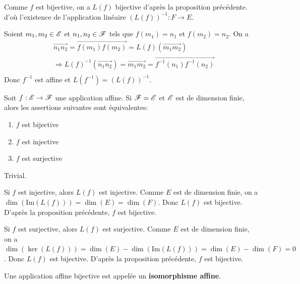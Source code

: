 \documentclass[a4paper, 12pt]{article}
\begin{document}
\begin{demonstration}
    Comme $f$ est bijective, on a $L(f)$ bijective d'après la proposition précédente.
    d'où l'existence de l'application linéaire $(L(f))^{-1}: F \to E$.

    Soient $m_1, m_2 \in \mathscr{E}$ et $n_1, n_2 \in \mathscr{F}$ tels que $f(m_1) = n_1$ et $f(m_2) = n_2$.
    On a
    \begin{align*}
        &\overrightarrow{n_1 n_2} = \overrightarrow{f(m_1) f(m_2)} = L(f)(\overrightarrow{m_1 m_2}) \\
        &\Rightarrow L(f)^{-1}(\overrightarrow{n_1 n_2}) = \overrightarrow{m_1 m_2} = \overrightarrow{f^{-1}(n_1)f^{-1}(n_2)} \\
    \end{align*}
    Donc $f^{-1}$ est affine et $L(f^{-1}) = (L(f))^{-1}$.
\end{demonstration}

\begin{proposition}{}{}
    Soit $f: \mathscr{E} \to \mathscr{F}$ une application affine.
    Si $\mathscr{F} = \mathscr{E}$ et $\mathscr{E}$ est de dimension finie, alors les assertions suivantes sont équivalentes:
    \begin{enumerate}
        \item $f$ est bijective
        \item $f$ est injective
        \item $f$ est surjective
    \end{enumerate}
\end{proposition}

\begin{demonstration}
    \begin{description}[leftmargin=!,labelwidth=2.5cm]
        \item[\textbf{(1) $\Rightarrow$ (2) et (3):}] Trivial.
        \item[\textbf{(2) $\Rightarrow$ (1):}] Si $f$ est injective, alors $L(f)$ est injective.
        Comme $E$ est de dimension finie, on a $\dim(\mathrm{Im}(L(f))) = \dim(E) = \dim(F)$.
        Donc $L(f)$ est bijective.
        D'après la proposition précédente, $f$ est bijective.
        \item[\textbf{(3) $\Rightarrow$ (1):}] Si $f$ est surjective, alors $L(f)$ est surjective.
        Comme $E$ est de dimension finie, on a $\dim(\ker(L(f))) = \dim(E) - \dim(\mathrm{Im}(L(f))) = \dim(E) - \dim(F) = 0$.
        Donc $L(f)$ est bijective.
        D'après la proposition précédente, $f$ est bijective.
    \end{description}
\end{demonstration}

\begin{definition}
    Une application affine bijective est appelée un \textbf{isomorphisme affine}.
\end{definition}
\end{document}
